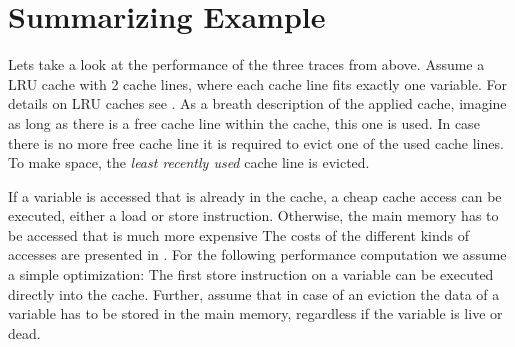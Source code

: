 \documentclass[onecolumn, openright, master, english, signatures]{dbrgrptt}
\begin{document}
\section{Summarizing Example}

Lets take a look at the performance of the three \ac{trace}s from above.
Assume a \ac{LRU} cache with 2 cache lines, where each cache line fits exactly one variable.
For details on \ac{LRU} caches see .
As a breath description of the applied cache, imagine as long as there is a free cache line within the cache, this one is used.
In case there is no more free cache line it is required to evict one of the used cache lines.
To make space, the \emph{least recently used} cache line is evicted.

If a variable is accessed that is already in the cache, a cheap cache access can be executed, either a load or store instruction.
Otherwise, the main memory has to be accessed that is much more expensive
The costs of the different kinds of accesses are presented in .
For the following performance computation we assume a simple optimization: The first store instruction on a variable can be executed directly into the cache.
Further, assume that in case of an eviction the data of a variable has to be stored in the main memory, regardless if the variable is live or dead.
\end{document}
